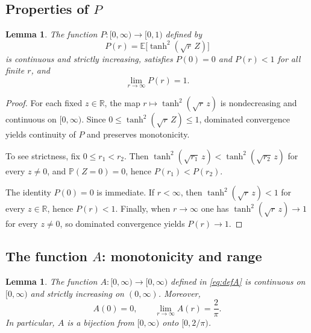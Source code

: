 \documentclass[11pt]{article}
\newtheorem{lemma}[theorem]{Lemma}
\begin{document}
\subsection{Properties of $P$}
\begin{lemma}\label{lem:P_properties-TOBECHECKED}
The function $P:[0,\infty)\to[0,1)$ defined by
\[
P(r)=\mathbb E\big[\tanh^2(\sqrt r\,Z)\big]
\]
is continuous and strictly increasing, satisfies $P(0)=0$ and $P(r)<1$ for all finite $r$, and
\[
\lim_{r\to\infty}P(r)=1.
\]
\end{lemma}
\begin{proof}
For each fixed $z\in\mathbb R$, the map $r\mapsto \tanh^2(\sqrt r\,z)$ is nondecreasing and continuous on $[0,\infty)$. Since $0\le \tanh^2(\sqrt r\,Z)\le 1$, dominated convergence yields continuity of $P$ and preserves monotonicity.

To see strictness, fix $0\le r_1<r_2$. Then $\tanh^2(\sqrt{r_1}\,z)<\tanh^2(\sqrt{r_2}\,z)$ for every $z\neq 0$, and $\mathbb{P}(Z=0)=0$, hence $P(r_1)<P(r_2)$.

The identity $P(0)=0$ is immediate. If $r<\infty$, then $\tanh^2(\sqrt r\,z)<1$ for every $z\in\mathbb R$, hence $P(r)<1$. Finally, when $r\to\infty$ one has $\tanh^2(\sqrt r\,z)\to 1$ for every $z\ne 0$, so dominated convergence yields $P(r)\to 1$.
\end{proof}

\subsection{The function $A$: monotonicity and range}
\begin{lemma}\label{lem:A-TOBECHECKED}
The function $A:[0,\infty)\to[0,\infty)$ defined in \eqref{eq:defA} is continuous on $[0,\infty)$ and strictly increasing on $(0,\infty)$. Moreover,
\[
A(0)=0,
\qquad
\lim_{r\to\infty}A(r)=\frac{2}{\pi}.
\]
In particular, $A$ is a bijection from $[0,\infty)$ onto $[0,2/\pi)$.
\end{lemma}
\end{document}
